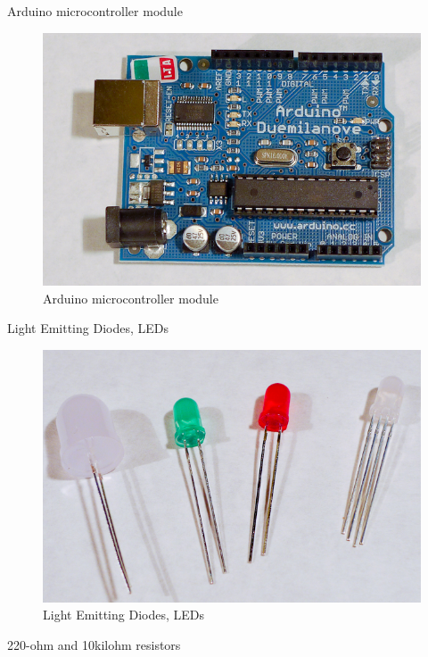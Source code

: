 Arduino microcontroller module

\begin{figure}[!htb]
 \centering
 \includegraphics[scale=0.3]{img/digitalio//arduino.jpg}
 \caption{Arduino microcontroller module}
 \label{Arduino microcontroller module}
\end{figure}

Light Emitting Diodes, LEDs

\begin{figure}[!htb]
 \centering
 \includegraphics[scale=0.3]{img/digitalio/leds.jpg}
 \caption{Light Emitting Diodes, LEDs}
 \label{Light Emitting Diodes, LEDs}
\end{figure}

220-ohm and 10kilohm resistors


